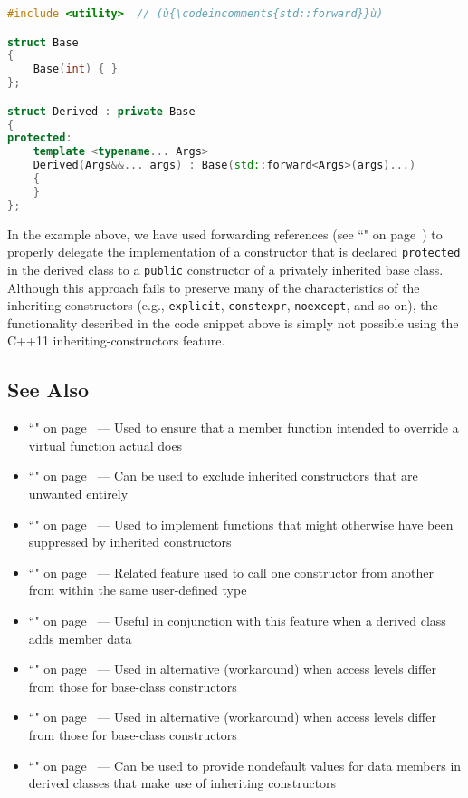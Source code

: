 \begin{lstlisting}[language=C++]
#include <utility>  // (ù{\codeincomments{std::forward}}ù)

struct Base
{
    Base(int) { }
};

struct Derived : private Base
{
protected:
    template <typename... Args>
    Derived(Args&&... args) : Base(std::forward<Args>(args)...)
    {
    }
};
\end{lstlisting}
    
\noindent In the example above, we have used forwarding references (see ``" on page~\pageref{forwardingref})
to properly delegate the implementation of a constructor that is
declared \mbox{\texttt{protected}} in the derived class to a \texttt{public}
constructor of a privately inherited base class. Although this approach
fails to preserve many of the characteristics of the inheriting
constructors (e.g., \texttt{explicit}, \texttt{constexpr},
\texttt{noexcept}, and so on), the functionality described in the code snippet above is
simply not possible using the C++11 inheriting-constructors feature.

\subsection[See Also]{See Also}\label{see-also}

\begin{itemize}
\item{``" on page~\pageref{override} — Used to ensure that a member function intended to override a virtual function actual does}
\item{``" on page~\pageref{deleted-functions} — Can be used to exclude inherited constructors that are unwanted entirely}
\item{``" on page~\pageref{Defaulted-Special-Member-Functions} — Used to implement functions that might otherwise have been suppressed by inherited constructors}
\item{``" on page~\pageref{delegating-constructors} — Related feature used to call one constructor from another from within the same user-defined type}
\item{``" on page~\pageref{Default-Member-Initializers} — Useful in conjunction with this feature when a derived class adds member data}
\item{``" on page~\pageref{forwardingref} — Used in alternative (workaround) when access levels differ from those for base-class constructors}
\item{``" on page~\pageref{variadictemplate} — Used in alternative (workaround) when access levels differ from those for base-class constructors}
\item{``" on page~\pageref{Default-Member-Initializers} — Can be used to provide nondefault values for data members in derived classes that make use of inheriting constructors}
\end{itemize}


